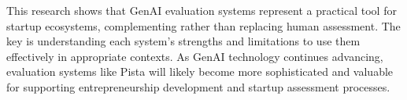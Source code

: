 This research shows that GenAI evaluation systems represent a practical tool for startup ecosystems, complementing rather than replacing human assessment. The key is understanding each system's strengths and limitations to use them effectively in appropriate contexts. As GenAI technology continues advancing, evaluation systems like Pista will likely become more sophisticated and valuable for supporting entrepreneurship development and startup assessment processes.